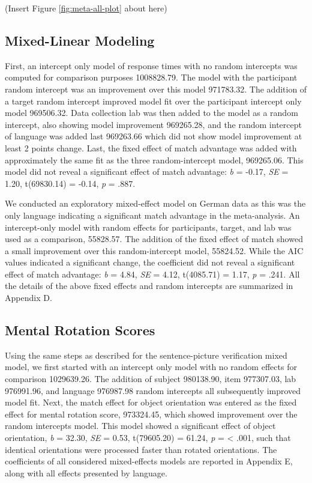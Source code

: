 \documentclass[
  man,floatsintext]{apa7}
\begin{document}
(Insert Figure \ref{fig:meta-all-plot} about here)

\hypertarget{mixed-linear-modeling}{%
\subsection{Mixed-Linear Modeling}\label{mixed-linear-modeling}}

First, an intercept only model of response times with no random intercepts was computed for comparison purposes 1008828.79. The model with the participant random intercept was an improvement over this model 971783.32. The addition of a target random intercept improved model fit over the participant intercept only model 969506.32. Data collection lab was then added to the model as a random intercept, also showing model improvement 969265.28, and the random intercept of language was added last 969263.66 which did not show model improvement at least 2 points change. Last, the fixed effect of match advantage was added with approximately the same fit as the three random-intercept model, 969265.06. This model did not reveal a significant effect of match advantage: \emph{b} = -0.17, \emph{SE} = 1.20, t(69830.14) = -0.14, \emph{p} = .887.

We conducted an exploratory mixed-effect model on German data as this was the only language indicating a significant match advantage in the meta-analysis. An intercept-only model with random effects for participants, target, and lab was used as a comparison, 55828.57. The addition of the fixed effect of match showed a small improvement over this random-intercept model, 55824.52. While the AIC values indicated a significant change, the coefficient did not reveal a significant effect of match advantage: \emph{b} = 4.84, \emph{SE} = 4.12, t(4085.71) = 1.17, \emph{p} = .241. All the details of the above fixed effects and random intercepts are summarized in Appendix D.

\hypertarget{mental-rotation-scores}{%
\subsection{Mental Rotation Scores}\label{mental-rotation-scores}}

Using the same steps as described for the sentence-picture verification mixed model, we first started with an intercept only model with no random effects for comparison 1029639.26. The addition of subject 980138.90, item 977307.03, lab 976991.96, and language 976987.98 random intercepts all subsequently improved model fit. Next, the match effect for object orientation was entered as the fixed effect for mental rotation score, 973324.45, which showed improvement over the random intercepts model. This model showed a significant effect of object orientation, \emph{b} = 32.30, \emph{SE} = 0.53, t(79605.20) = 61.24, \emph{p} = \textless{} .001, such that identical orientations were processed faster than rotated orientations. The coefficients of all considered mixed-effects models are reported in Appendix E, along with all effects presented by language.
\end{document}
